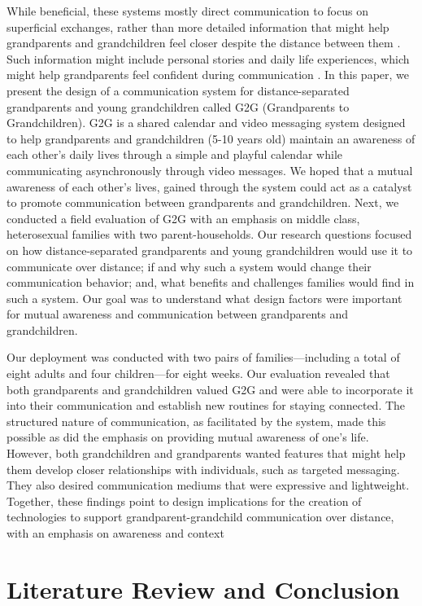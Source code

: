 While beneficial, these systems mostly direct
communication to focus on superficial exchanges, rather
than more detailed information that might help
grandparents and grandchildren feel closer despite the
distance between them . Such information might include
personal stories and daily life experiences, which might
help grandparents feel confident during communication .
In this paper, we present the design of a communication
system for distance-separated grandparents and young
grandchildren called G2G (Grandparents to Grandchildren).
G2G is a shared calendar and video messaging system
designed to help grandparents and grandchildren (5-10
years old) maintain an awareness of each other’s daily lives
through a simple and playful calendar while communicating
asynchronously through video messages. We hoped that a
mutual awareness of each other’s lives, gained through the
system could act as a catalyst to promote communication
between grandparents and grandchildren.
Next, we conducted a field evaluation of G2G with an
emphasis on middle class, heterosexual families with two
parent-households. Our research questions focused on how
distance-separated grandparents and young grandchildren
would use it to communicate over distance; if and why such
a system would change their communication behavior; and,
what benefits and challenges families would find in such a
system. Our goal was to understand what design factors
were important for mutual awareness and communication
between grandparents and grandchildren. 

Our deployment
was conducted with two pairs of families—including a total
of eight adults and four children—for eight weeks.
Our evaluation revealed that both grandparents and
grandchildren valued G2G and were able to incorporate it
into their communication and establish new routines for
staying connected. The structured nature of communication,
as facilitated by the system, made this possible as did the
emphasis on providing mutual awareness of one’s life.
However, both grandchildren and grandparents wanted
features that might help them develop closer relationships
with individuals, such as targeted messaging. They also
desired communication mediums that were expressive and
lightweight. Together, these findings point to design
implications for the creation of technologies to support
grandparent-grandchild communication over distance, with
an emphasis on awareness and context

\section{Literature Review and Conclusion}

